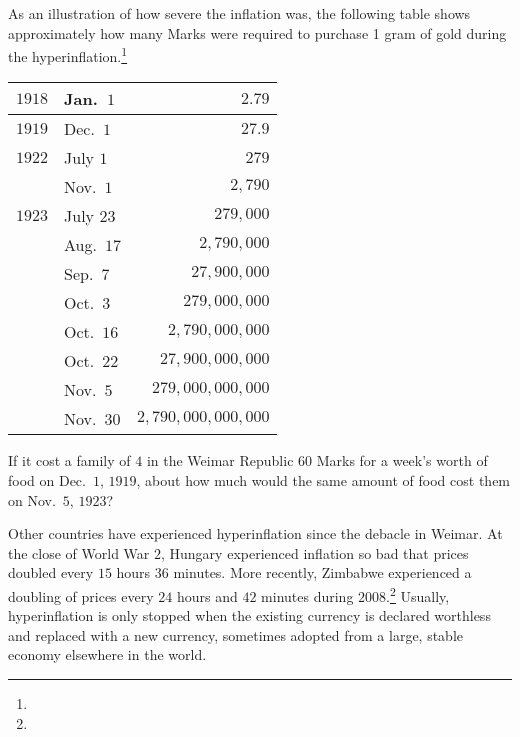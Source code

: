 \documentclass{ximera}
\begin{document}
As an illustration of how severe the inflation was, the following table shows approximately how many Marks were required to purchase 1 gram of gold during the hyperinflation.\footnote{}

\begin{center}
\begin{tabular}{@{}llr@{}}\toprule
\textbf{$1918$} & Jan.\ $1$ & $2.79$ \\\midrule
\textbf{$1919$} & Dec.\ $1$ & $27.9$\\\midrule
\textbf{$1922$} & July $1$ & $279$\\
 & Nov.\ $1$ & $2,790$\\\midrule
 \textbf{$1923$} & July $23$ & $279,000$\\
 & Aug.\ $17$ & $2,790,000$\\
 &  Sep.\ $7$ & $27,900,000$\\
 & Oct.\ $3$ & $279,000,000$\\
 & Oct.\ $16$ & $2,790,000,000$\\
 &  Oct.\ $22$ & $27,900,000,000$\\
 & Nov.\ $5$ & $279,000,000,000$\\
 & Nov.\ $30$ & $2,790,000,000,000$\\\bottomrule
\end{tabular}
\end{center}

\begin{question}
If it cost a family of $4$ in the Weimar Republic $60$ Marks for a week's worth of food on Dec.\ $1$, $1919$, about how much would the same amount of food cost them on Nov.\ $5$, $1923$?
\begin{solution}
\begin{multiple-choice}
\end{multiple-choice}
\end{solution}	
\end{question}

Other countries have experienced hyperinflation since the debacle in Weimar. At the close of World War $2$, Hungary experienced inflation so bad that prices doubled every $15$ hours $36$ minutes. More recently, Zimbabwe experienced a doubling of prices every $24$ hours and $42$ minutes during $2008$.\footnote{} Usually, hyperinflation is only stopped when the existing currency is declared worthless and replaced with a new currency, sometimes adopted from a large, stable economy elsewhere in the world.
\end{document}
